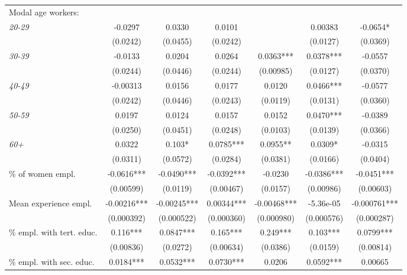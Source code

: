 \begin{threeparttable}
\begin{tabular}{l*{6}{S}}
Modal age workers:        \\[1ex]
\quad \textit{20-29}      &  -0.0297     & 0.0330      & 0.0101     &             & 0.00383    & -0.0654*     \\
                          &  (0.0242)    & (0.0455)    & (0.0242)   &             & (0.0127)   & (0.0369)     \\[1ex]
\quad \textit{30-39}      &  -0.0133     & 0.0204      & 0.0264     & 0.0363***   & 0.0378***  & -0.0557      \\
                          &  (0.0244)    & (0.0446)    & (0.0244)   & (0.00985)   & (0.0127)   & (0.0370)     \\[1ex]
\quad \textit{40-49}      &  -0.00313    & 0.0156      & 0.0177     & 0.0120      & 0.0466***  & -0.0577      \\
                          &  (0.0242)    & (0.0446)    & (0.0243)   & (0.0119)    & (0.0131)   & (0.0360)     \\[1ex]
\quad \textit{50-59}      &  0.0197      & 0.0124      & 0.0157     & 0.0152      & 0.0470***  & -0.0389      \\
                          &  (0.0250)    & (0.0451)    & (0.0248)   & (0.0103)    & (0.0139)   & (0.0366)     \\[1ex]
\quad \textit{60+}        &  0.0322      & 0.103*      & 0.0785***  & 0.0955**    & 0.0309*    & -0.0315      \\
                          &  (0.0311)    & (0.0572)    & (0.0284)   & (0.0381)    & (0.0166)   & (0.0404)     \\[1ex]
\% of women empl.         &  -0.0616***  & -0.0490***  & -0.0392*** & -0.0230     & -0.0386*** & -0.0451***   \\
                          &  (0.00599)   & (0.0119)    & (0.00467)  & (0.0157)    & (0.00986)  & (0.00603)    \\[1ex]
Mean experience empl.     &  -0.00216*** & -0.00245*** & 0.00344*** & -0.00468*** & -5.36e-05  & -0.000761*** \\
                          &  (0.000392)  & (0.000522)  & (0.000360) & (0.000980)  & (0.000576) & (0.000287)   \\[1ex]
\% empl. with tert. educ. &  0.116***    & 0.0847***   & 0.165***   & 0.249***    & 0.103***   & 0.0799***    \\
                          &  (0.00836)   & (0.0272)    & (0.00634)  & (0.0386)    & (0.0159)   & (0.00814)    \\[1ex]
\% empl. with sec. educ.  &  0.0184***   & 0.0532***   & 0.0730***  & 0.0206      & 0.0592***  & 0.00665      \\

\end{tabular}
\end{threeparttable}
